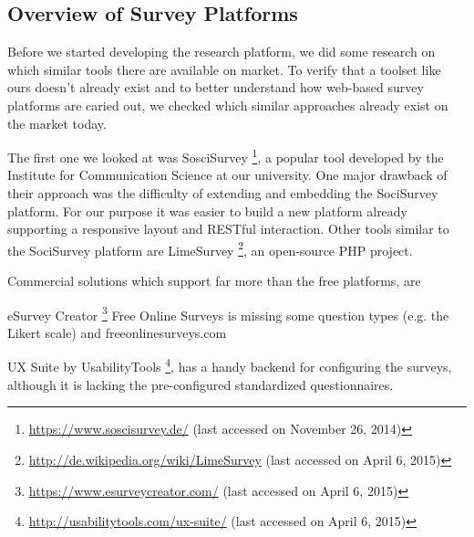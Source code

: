 






	\subsection{Overview of Survey Platforms}
	Before we started developing the research platform, we did some research on which similar tools there are available on market. To verify that a toolset like ours doesn't already exist and to better understand how web-based survey platforms are caried out, we checked which similar approaches already exist on the market today.

	The first one we looked at was SosciSurvey \footnote{\url{https://www.soscisurvey.de/} (last accessed on November 26, 2014)}, a popular tool developed by the Institute for Communication Science at our university. One major drawback of their approach was the difficulty of extending and embedding the SociSurvey platform. For our purpose it was easier to build a new platform already supporting a responsive layout and RESTful interaction. Other tools similar to the SociSurvey platform are LimeSurvey \footnote{\url{http://de.wikipedia.org/wiki/LimeSurvey} (last accessed on April 6, 2015)}, an open-source PHP project.

	Commercial solutions which support far more than the free platforms, are 
	
		eSurvey Creator \footnote{\url{https://www.esurveycreator.com/} (last accessed on April 6, 2015)}
		Free Online Surveys is missing some question types (e.g. the Likert scale) and freeonlinesurveys.com

		UX Suite by UsabilityTools \footnote{\url{http://usabilitytools.com/ux-suite/} (last accessed on April 6, 2015)}, has a handy backend for configuring the surveys, although it is lacking the pre-configured standardized questionnaires. 
		

